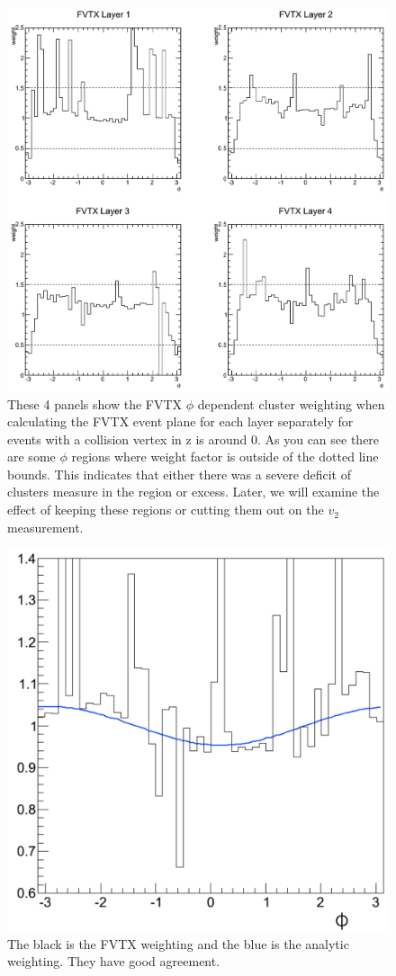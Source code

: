 \begin{figure}[h!]
\begin{center}
\includegraphics[width=0.75\linewidth]{figs/fvtx_weighting.png}
\caption{These 4 panels show the FVTX $\phi$ dependent cluster weighting when calculating the FVTX event plane for each layer separately for events with a collision vertex in z is around 0. As you can see there are some $\phi$ regions where weight factor is outside of the dotted line bounds. This indicates that either there was a severe deficit of clusters measure in the region or excess. Later, we will examine the effect of keeping these regions or cutting them out on the $v_2$ measurement.}
\label{fig:fvtx_weighting}
\end{center}
\end{figure}
\begin{figure}[!h]
\begin{center}
\includegraphics[width=0.5\linewidth]{figs/comparison_of_weights.png}
\caption{The black is the FVTX weighting and the blue is the analytic weighting. They have good agreement.}
\end{center}
\end{figure}

